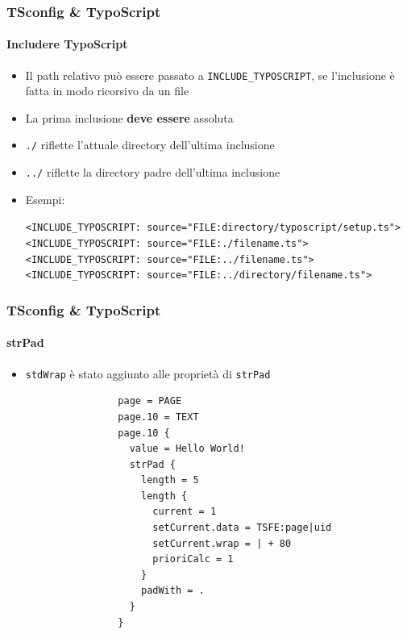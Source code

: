 
\begin{frame}[fragile]
	\frametitle{TSconfig \& TypoScript}
	\framesubtitle{Includere TypoScript}

	\begin{itemize}
		\item Il path relativo può essere passato a \texttt{INCLUDE\_TYPOSCRIPT},\newline
			se l'inclusione è fatta in modo ricorsivo da un file
		\item La prima inclusione \textbf{deve essere} assoluta
		\item \texttt{./} riflette l'attuale directory dell'ultima inclusione
		\item \texttt{../} riflette la directory padre dell'ultima inclusione
		\item Esempi:

			\lstinline!<INCLUDE_TYPOSCRIPT: source="FILE:directory/typoscript/setup.ts">!
			\lstinline!<INCLUDE_TYPOSCRIPT: source="FILE:./filename.ts">!
			\lstinline!<INCLUDE_TYPOSCRIPT: source="FILE:../filename.ts">!
			\lstinline!<INCLUDE_TYPOSCRIPT: source="FILE:../directory/filename.ts">!

	\end{itemize}

\end{frame}


\begin{frame}[fragile]
	\frametitle{TSconfig \& TypoScript}
	\framesubtitle{strPad}

	\begin{itemize}
		\item \texttt{stdWrap} è stato aggiunto alle proprietà di \texttt{strPad}

			\begin{lstlisting}
				page = PAGE
				page.10 = TEXT
				page.10 {
				  value = Hello World!
				  strPad {
				    length = 5
				    length {
				      current = 1
				      setCurrent.data = TSFE:page|uid
				      setCurrent.wrap = | + 80
				      prioriCalc = 1
				    }
				    padWith = .
				  }
				}
			\end{lstlisting}

	\end{itemize}

\end{frame}

